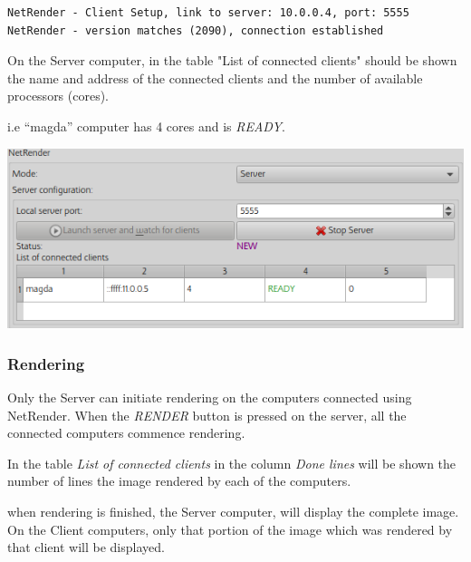 \begin{verbatim} 
NetRender - Client Setup, link to server: 10.0.0.4, port: 5555
NetRender - version matches (2090), connection established 
\end{verbatim}

On the Server computer, in the table "List of connected clients" should be shown
the name and address of the connected clients and the number of available
processors (cores).

i.e ``magda'' computer has 4 cores and is \emph{READY}.

\includegraphics[width=0.7\linewidth]{img/manual/media/netrender_server_connected.png}

\subsubsection{Rendering}\label{rendering}

Only the Server can initiate rendering on the computers connected using
NetRender. When the \emph{RENDER} button is pressed on the server, all the
connected computers commence rendering.

In the table \emph{List of connected clients} in the column \emph{Done lines} will be
shown the number of lines the image rendered by each of the computers.

when rendering is finished, the Server computer, will display the complete
image. On the Client computers, only that portion of the image which was
rendered by that client will be displayed.
